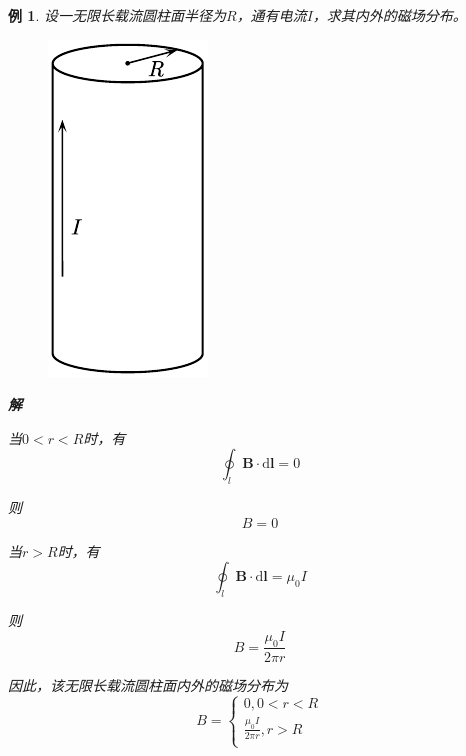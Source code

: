\documentclass[12pt, a4paper, twoside]{ctexbook}
\newtheorem{example}[theorem]{例}
\begin{document}
\begin{example}
    设一无限长载流圆柱面半径为$R$，通有电流$I$，求其内外的磁场分布。
    \begin{figure}[H]
        \centerline{\includegraphics[scale=0.88]{CH10EX04.pdf}}
    \end{figure}
    \noindent\textbf{解}

    当$0<r<R$时，有
    $$
    \oint_l\boldsymbol{B}\cdot\mathrm{d}\boldsymbol{l}=0
    $$

    则
    $$
    B=0
    $$
    
    当$r>R$时，有
    $$
    \oint_l\boldsymbol{B}\cdot\mathrm{d}\boldsymbol{l}=\mu_0I
    $$

    则
    $$
    B=\frac{\mu_0I}{2\pi r}
    $$

    因此，该无限长载流圆柱面内外的磁场分布为
    $$
    B=\left\{ \begin{array}{l}
        0,0<r<R\\
        \frac{\mu _0I}{2\pi r},r>R\\
    \end{array} \right. 
    $$
\end{example}
\end{document}
